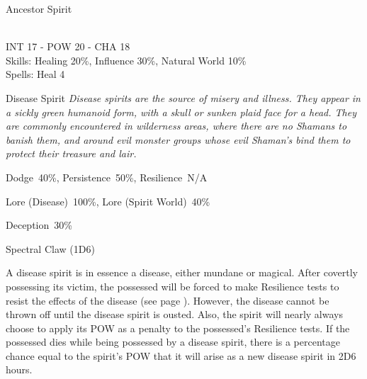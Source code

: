 \begin{samepage}
\begin{monsterbox}{Ancestor Spirit}
	\begin{rpg-monsteraction}
		\\INT 17 - POW 20 - CHA 18\\
		Skills: Healing 20\%, Influence 30\%, Natural World 10\%\\
                Spells: Heal 4
	\end{rpg-monsteraction}
\end{monsterbox}
\end{samepage}


\begin{samepage}
\begin{monsterbox}{Disease Spirit}
	\textit{Disease spirits are the source of misery and illness. They appear in a sickly green humanoid form, with a skull or sunken plaid face for a head.
They are commonly encountered in wilderness areas, where there are no Shamans to banish them, and around evil monster groups whose evil Shaman’s bind them to protect their treasure and lair.}\\
	\rpghline
	\basics[%
	powerpoints = 17,
	movementrate = 30m,
	plunderrating = 0
	]
	\rpghline%
	\stats[ %
		STR = -,
		CON = -,
		DEX = -,
		SIZ = -,
		INT = 2D6    (7),
		POW = 3D6+6  (17),
		CHA = 3D6    (11)
	]
	\rpghline%
	\begin{rpg-monsteraction}[Resistances]
		Dodge~40\%, Persistence~50\%, Resilience~N/A
	\end{rpg-monsteraction}
	\begin{rpg-monsteraction}[Knowledge]
		Lore (Disease)~100\%, Lore (Spirit World)~40\%
	\end{rpg-monsteraction}
	\begin{rpg-monsteraction}[Practical]
		Deception~30\%
	\end{rpg-monsteraction}
	\begin{rpg-monsteraction}
		Spectral Claw (1D6)
	\end{rpg-monsteraction}
	\begin{rpg-monsteraction}
		A disease spirit is in essence a disease, either mundane or magical. After covertly possessing its victim, the possessed will be forced to make Resilience tests to resist the effects of the disease (see page \pageref{ssec:disease}). However, the disease cannot be thrown off until the disease spirit is ousted. Also, the spirit will nearly always choose to apply its POW as a penalty to the possessed’s Resilience tests.
		If the possessed dies while being possessed by a disease spirit, there is a percentage chance equal to the spirit’s POW that it will arise as a new disease spirit in 2D6 hours.
	\end{rpg-monsteraction}
\end{monsterbox}
\end{samepage}


